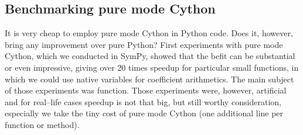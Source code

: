 \subsection{Benchmarking pure mode Cython}

It is very cheap to employ pure mode Cython in Python code. Does it, however, bring any improvement
over pure Python? First experiments with pure mode Cython, which we conducted in SymPy, showed that
the befit can be substantial or even impressive, giving over 20 times speedup for particular small
functions, in which we could use native variables for coefficient arithmetics. The main subject of
those experiments was  function. Those experiments were, however, artificial and
for real--life cases speedup is not that big, but still worthy consideration, especially we take
the tiny cost of pure mode Cython (one additional line per function or method).

